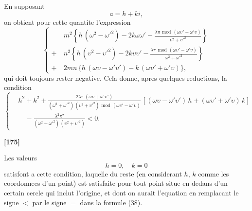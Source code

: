 \documentclass[11pt,a4paper]{book}
\providecommand{\modd}{\ \mathrm{mod}\ }
\begin{document}
En supposant
\[a = h + ki,\]
on obtient pour cette quantite l'expression
\begin{equation}
\left\{
\begin{aligned}
&m^2 \left\{h\, (\omega^2 - \omega'^2) - 2k\omega\omega' - \frac{\lambda\pi\, \modd\, (\omega\upsilon' - \omega'\upsilon)}{\upsilon^2 + \upsilon'^2}\right\}\\
+\ &n^2 \left\{h\, (\upsilon^2 - \upsilon'^2) - 2k\upsilon\upsilon' - \frac{\lambda\pi\, \modd\, (\omega\upsilon' - \omega'\upsilon)}{\omega^2 + \omega'^2}\right\}\\
+\ &2mn\, \{h\, (\omega\upsilon - \omega'\upsilon') - k\, (\omega\upsilon' + \omega'\upsilon)\},
\end{aligned}
\right. \tag{37}
\end{equation}
qui doit toujours rester negative. Cela donne, apres quelques reductions, la condition
\begin{equation}
\left\{
\begin{aligned}
&h^2 + k^2 + \frac{2\lambda\pi\, (\omega\upsilon + \omega'\upsilon')}{(\omega^2 + \omega'^2)\, (\upsilon^2 + \upsilon'^2)\, \modd\, (\omega\upsilon' - \omega'\upsilon)}\, [(\omega\upsilon - \omega'\upsilon')\, h + (\omega\upsilon' + \omega'\upsilon)\, k]\\
&\quad - \frac{\lambda^2 \pi^2}{(\omega^2 + \omega'^2)\, (\upsilon^2 + \upsilon'^2)} < 0.
\end{aligned}
\right. \tag{38}
\end{equation}


\textbf{[175]}

Les valeurs
\[h = 0,\quad k = 0\]
satisfont a cette condition, laquelle du reste (en considerant $h$, $k$ comme les coordonnees
d'un point) est satisfaite pour tout point situe en dedans d'un certain cercle qui inclut
l'origine, et dont on aurait l'equation en remplacant le signe $<$ par le signe $=$ dans
la formule (38).
\end{document}
